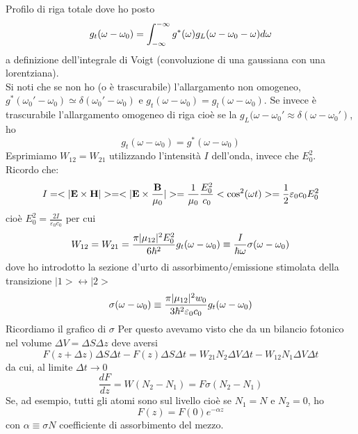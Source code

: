 Profilo di riga totale
dove ho posto
\begin{equation*}
g_t(\omega - \omega_0) = \int_{-\infty}^{-\infty} g^*(\omega) g_L(\omega - \omega_0 - \omega) d\omega
\end{equation*}
a definizione dell'integrale di Voigt (convoluzione di una gaussiana con una lorentziana).
\\
Si noti che se non ho (o è trascurabile) l'allargamento non omogeneo, $g^*(\omega_0' - \omega_0) \simeq \delta(\omega_0' - \omega_0)$ e $g_t(\omega - \omega_0) = g_l(\omega - \omega_0)$. Se invece è trascurabile l'allargamento omogeneo di riga cioè se la $g_L(\omega -\omega_0' \approx \delta(\omega - \omega_0')$, ho
\begin{equation*}
g_t(\omega - \omega_0) = g^*(\omega - \omega_0)
\end{equation*}
Esprimiamo $W_{12} = W_{21}$ utilizzando l'intensità $I$ dell'onda, invece che $E_0^2$.\\
Ricordo che:
\begin{equation*}
I = <|\*E \times \*H|> = <|\*E \times \frac{\*B}{\mu_0}|> = \frac{1}{\mu_0} \frac{E_0^2}{c_0} <\cos^2(\omega t)> = \frac{1}{2} \varepsilon_0 c_0 E_0^2
\end{equation*}
cioè $E_0^2 = \frac{2I}{\varepsilon_0 c_0}$ per cui
\begin{equation*}
W_{12} = W_{21} = \frac{\pi |\*\mu_{12}|^2 E_0^2}{6\hbar^2} g_t(\omega - \omega_0) \equiv \frac{I}{\hbar \omega} \sigma(\omega - \omega_0)
\end{equation*}
dove ho introdotto la sezione d'urto di assorbimento/emissione stimolata della transizione $|1> \leftrightarrow |2>$
\begin{equation*}
\sigma(\omega - \omega_0) \equiv \frac{\pi |\*\mu_{12}|^2 w_0}{3 \hbar^2 \varepsilon_0 c_0} g_t(\omega - \omega_0)
\end{equation*}
Ricordiamo il grafico di $\sigma$
Per questo avevamo visto che da un bilancio fotonico nel volume $\Delta V = \Delta S \Delta z$ deve aversi
\begin{equation*}
F(z + \Delta z) \Delta S \Delta t - F(z) \Delta S \Delta t = W_{21} N_2 \Delta V \Delta t - W_{12} N_1 \Delta V \Delta t
\end{equation*}
da cui, al limite $\Delta t \rightarrow 0$
\begin{equation*}
\frac{dF}{dz} = W(N_2 - N_1) = F \sigma(N_2 - N_1)
\end{equation*}
Se, ad esempio, tutti gli atomi sono sul livello  cioè se $N_1 = N$ e $N_2 = 0$, ho
\begin{equation*}
F(z) = F(0) e^{-\alpha z}
\end{equation*}
con $\alpha \equiv \sigma N$ coefficiente di assorbimento del mezzo.

